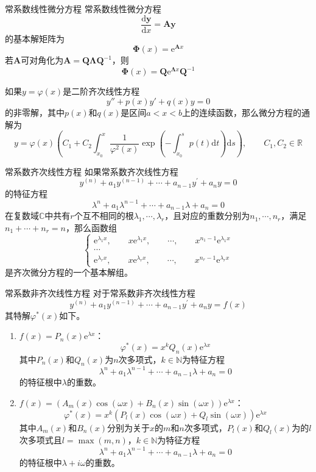 \documentclass[lang = cn, scheme = chinese, thmcnt = section]{elegantbook}
\newcommand{\N}{\mathbb{N}}            %
\newcommand{\R}{\mathbb{R}}            %
\newcommand{\C}{\mathbb{C}}  		   %
\newcommand{\bs}{\boldsymbol}          %
\newcommand{\dd}{\mathrm{d}}           %
\newcommand{\ee}[1]{\mathrm{e}^{#1}}           %
\begin{document}
\begin{theorem}{常系数线性微分方程}
	常系数线性微分方程%
	$$
	\frac{\dd \bs{y}}{\dd x}=\bs{A}\bs{y}
	$$
	的基本解矩阵为%
	$$
	\bs{\Phi}(x)=\ee{\bs{A}x}
	$$
	若$\bs{A}$可对角化为$\bs{A}=\bs{Q\Lambda Q}^{-1}$，则
	$$
	\bs{\Phi}(x)=\bs{Q}\ee{\bs{\Lambda}x}\bs{Q}^{-1}
	$$
\end{theorem}

\begin{theorem}
	如果$y=\varphi(x)$是二阶齐次线性方程
	$$
	y''+p(x)y'+q(x)y=0
	$$
	的非零解，其中$p(x)$和$q(x)$是区间$a<x<b$上的连续函数，那么微分方程的通解为
	$$
	y=\varphi(x)\left(C_1+C_2\int_{x_0}^{x}{\frac{1}{\varphi^2(x)}\exp\left(-\int_{x_0}^{s}{p(t)\mathrm{d}t}\right)\mathrm{d}s}\right),\qquad C_1,C_2\in\R
	$$
\end{theorem}

\begin{theorem}{常系数齐次线性方程}
	如果常系数齐次线性方程
	$$
	y^{(n)}+a_1y^{(n-1)}+\cdots+a_{n-1}y^{\prime}+a_ny=0
	$$
	的特征方程
	$$
	\lambda^n+a_1\lambda^{n-1}+\cdots+a_{n-1}\lambda+a_n=0
	$$
	在复数域$\C$中共有$r$个互不相同的根$\lambda_1,\cdots,\lambda_r$，且对应的重数分别为$n_1,\cdots,n_r$，满足$n_1+\cdots+n_r=n$，那么函数组
	$$
	\begin{cases}
		\mathrm{e}^{\lambda_1 x},
		\qquad 
		x\mathrm{e}^{\lambda_1 x},
		\qquad
		\cdots,
		\qquad 
		x^{n_1-1}\mathrm{e}^{\lambda_1 x}\\
		\cdots\\
		\mathrm{e}^{\lambda_r x},\qquad
		x\mathrm{e}^{\lambda_r x},\qquad
		\cdots,\qquad
		x^{n_r-1}\mathrm{e}^{\lambda_r x}
	\end{cases}
	$$
	是齐次微分方程的一个基本解组。
\end{theorem}

\begin{theorem}{常系数非齐次线性方程}
	对于常系数非齐次线性方程
	$$
	y^{(n)}+a_1y^{(n-1)}+\cdots+a_{n-1}y^{\prime}+a_ny=f(x)
	$$
	其特解$\varphi^*(x)$如下。
	\begin{enumerate}
		\item $f(x)=P_n(x)\mathrm{e}^{\lambda x}$：
		$$
		\varphi^*(x)=x^k Q_n(x)\mathrm{e}^{\lambda x}
		$$
		其中$P_n(x)$和$Q_n(x)$为$n$次多项式，$k\in \N$为特征方程
		$$
		\lambda^n+a_1\lambda^{n-1}+\cdots+a_{n-1}\lambda+a_n=0
		$$
		的特征根中$\lambda$的重数。
		\item $f(x)=(A_m(x)\cos(\omega x)+B_n(x)\sin(\omega x))\mathrm{e}^{\lambda x}$：
		$$
		\varphi^*(x)=x^k(P_l(x)\cos(\omega x)+Q_l\sin(\omega x))\mathrm{e}^{\lambda x}
		$$
		其中$A_m(x)$和$B_n(x)$分别为关于$x$的$m$和$n$次多项式，$P_l(x)$和$Q_l(x)$为的$l$次多项式且$l=\max(m,n)$，$k\in \N$为特征方程
		$$
		\lambda^n+a_1\lambda^{n-1}+\cdots+a_{n-1}\lambda+a_n=0
		$$
		的特征根中$\lambda+i\omega$的重数。
	\end{enumerate}
\end{theorem}
\end{document}
